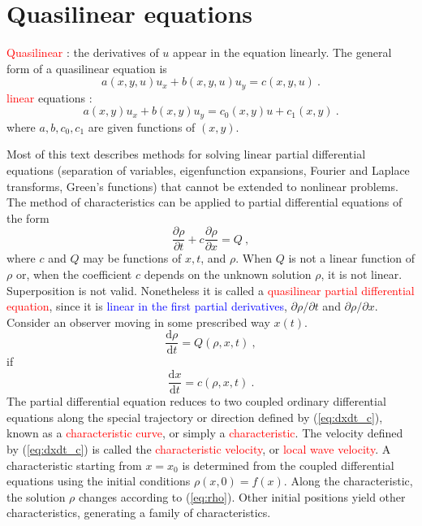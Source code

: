 \documentclass[12pt,a4paper]{article}
\newcommand{\dif}{\mathrm{d}}
\begin{document}
\section{Quasilinear equations}
\cite{pinchover2005introduction} \textcolor{red}{Quasilinear} : the derivatives of $u$ appear in the equation linearly. The general form of a quasilinear equation is
\begin{equation}
a(x, y, u) u_x +b(x, y, u) u_y = c(x, y, u) ~.
\end{equation}
\textcolor{red}{linear} equations :
\begin{equation}
a(x, y) u_x +b(x, y) u_y = c_0(x, y) u+c_1(x, y) ~.
\end{equation}
where $a, b, c_0, c_1$ are given functions of $(x, y)$.


\cite{haberman2013applied} Most of this text describes methods for solving linear partial differential equations (separation of variables, eigenfunction expansions, Fourier and Laplace transforms, Green's functions) that cannot be extended to nonlinear problems. The method of characteristics can be applied to partial differential equations of the form
\begin{equation}
\dfrac{\partial \rho}{\partial t} + c\dfrac{\partial \rho}{\partial x} = Q ~,
\end{equation}
where $c$ and $Q$ may be functions of $x, t$, and $\rho$. When $Q$ is not a linear function of $\rho$ or, when the coefficient $c$ depends on the unknown solution $\rho$, it is not linear. Superposition is not valid. Nonetheless it is called a \textcolor{red}{quasilinear partial differential equation}, since it is \textcolor{blue}{linear in the first partial derivatives}, $\partial \rho/\partial t$ and $\partial \rho/\partial x$. Consider an observer moving in some prescribed way $x(t)$.
\begin{equation}
\dfrac{\dif \rho}{\dif t} = Q(\rho, x, t) ~,
\label{eq:rho}
\end{equation}
if
\begin{equation}
\dfrac{\dif x}{\dif t} = c(\rho, x, t) ~.
\label{eq:dxdt_c}
\end{equation}
The partial differential equation reduces to two coupled ordinary differential equations along the special trajectory or direction defined by (\ref{eq:dxdt_c}), known as a \textcolor{red}{characteristic curve}, or simply a \textcolor{red}{characteristic}. The velocity defined by (\ref{eq:dxdt_c}) is called the \textcolor{red}{characteristic velocity}, or \textcolor{red}{local wave velocity}. A characteristic starting from $x = x_0$ is determined from the coupled differential equations using the initial conditions $\rho(x,0) = f(x)$. Along the characteristic, the solution $\rho$ changes according to (\ref{eq:rho}). Other initial positions yield other characteristics, generating a family of characteristics.
\end{document}
